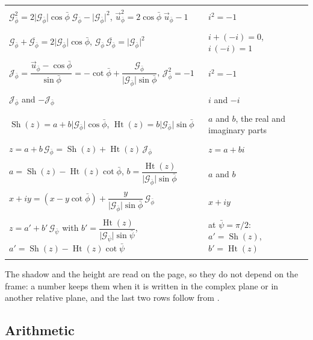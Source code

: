 \documentclass[11pt,a4paper]{amsart}
\makeatletter
\theoremstyle{plain}
\theoremstyle{definition}
\theoremstyle{remark}
\newcommand{\pb}{\bar{\phi}}                     %
\newcommand{\Gp}{\mathcal{G}_{\bar{\phi}}}       %
\newcommand{\up}{\vec{u}_{\bar{\phi}}}           %
\newcommand{\Jp}{\mathcal{J}_{\bar{\phi}}}       %
\DeclareMathOperator{\Sh}{Sh}                    %
\DeclareMathOperator{\Ht}{Ht}                    %
\newcommand{\gnlaw}[3]{\multicolumn{2}{@{}l@{}}{\small\itshape #1}\\* #2 & #3 \\ \addlinespace[4pt]}
\newenvironment{gnlaws}{%
  \begin{longtable}{@{}>{\small\raggedright\arraybackslash}p{0.62\textwidth}@{\hspace{0.04\textwidth}}>{\small\raggedright\arraybackslash}p{0.32\textwidth}@{}}
  \toprule
  \multicolumn{1}{@{}l}{\textsc{in a relative plane}} & \multicolumn{1}{l@{}}{\textsc{the complex case}} \\
  \midrule
  \endhead
  \bottomrule
  \endlastfoot}
  {\end{longtable}}
\makeatother
\begin{document}
\begin{gnlaws}
\gnlaw{the Rule of the Square (\Cref{prop:square-rule})}
  {$\Gp^2 = 2\lvert\Gp\rvert\cos\pb\;\Gp - \lvert\Gp\rvert^2$, \quad $\up^2 = 2\cos\pb\;\up - 1$}
  {$i^2 = -1$}
\gnlaw{the Composer Unit and its conjugate (\Cref{thm:conjugate})}
  {$\Gp + \overline{\Gp} = 2\lvert\Gp\rvert\cos\pb$, \quad $\Gp\,\overline{\Gp} = \lvert\Gp\rvert^2$}
  {$i + (-i) = 0$, \quad $i\,(-i) = 1$}
\gnlaw{the Turning Unit (\Cref{def:turning-unit,thm:turning-unit})}
  {$\Jp = \dfrac{\up - \cos\pb}{\sin\pb} = -\cot\pb + \dfrac{\Gp}{\lvert\Gp\rvert\sin\pb}$, \quad $\Jp^2 = -1$}
  {$i^2 = -1$}
\gnlaw{the square roots of $-1$ (\Cref{thm:turning-unit})}
  {$\Jp$ and $-\Jp$}
  {$i$ and $-i$}
\gnlaw{shadow and height (\Cref{def:shadow-height})}
  {$\Sh(z) = a + b\lvert\Gp\rvert\cos\pb$, \quad $\Ht(z) = b\lvert\Gp\rvert\sin\pb$}
  {$a$ and $b$, the real and imaginary parts}
\gnlaw{the two frames (\Cref{prop:shadow-height})}
  {$z = a + b\,\Gp = \Sh(z) + \Ht(z)\,\Jp$}
  {$z = a + bi$}
\gnlaw{back to the leaning frame (\Cref{prop:shadow-height})}
  {$a = \Sh(z) - \Ht(z)\cot\pb$, \quad $b = \dfrac{\Ht(z)}{\lvert\Gp\rvert\sin\pb}$}
  {$a$ and $b$}
\gnlaw{from the complex plane (\Cref{cor:bridge})}
  {$x + iy = (x - y\cot\pb) + \dfrac{y}{\lvert\Gp\rvert\sin\pb}\,\Gp$}
  {$x + iy$}
\gnlaw{to another true relative plane $\mathbb{G}_{\bar{\psi}}$}
  {$z = a' + b'\,\mathcal{G}_{\bar{\psi}}$ with $b' = \dfrac{\Ht(z)}{\lvert\mathcal{G}_{\bar{\psi}}\rvert\sin\bar{\psi}}$, \quad $a' = \Sh(z) - \Ht(z)\cot\bar{\psi}$}
  {at $\bar{\psi} = \pi/2$: \newline $a' = \Sh(z)$, \quad $b' = \Ht(z)$}
\end{gnlaws}
The shadow and the height are read on the page, so they do not depend on the frame: a number keeps them when it is written in the complex plane or in another relative plane, and the last two rows follow from .

\subsection{Arithmetic}\label{app:arithmetic}
\end{document}
